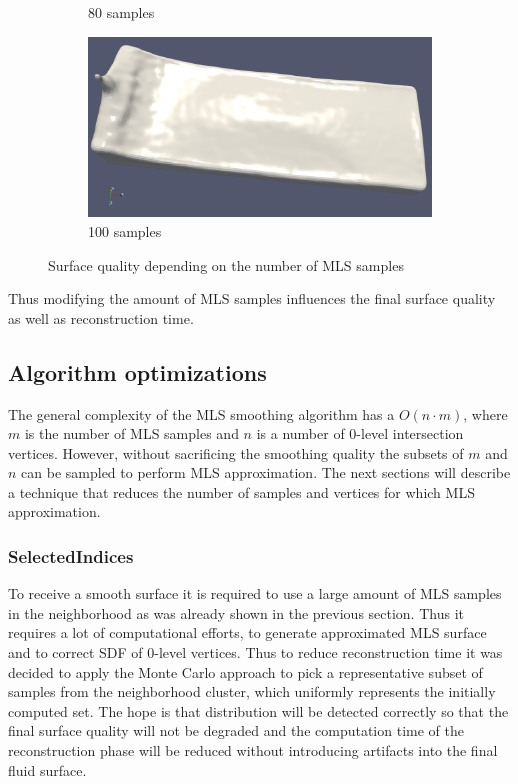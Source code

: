 \begin{figure}[H]
\begin{center}
\begin{subfigure}[b]{0.4\textwidth}
			\caption{80 samples}
		\end{subfigure}
		\begin{subfigure}[b]{0.4\textwidth}
			\includegraphics[width=\textwidth]{figures/MlsSamples100.png}
			\caption{100 samples}
		\end{subfigure}
	\end{center}
	\caption{Surface quality depending on the number of MLS samples} \label{fig:mls_samples_example_surfaces}
\end{figure}
Thus modifying the amount of MLS samples influences the final surface quality as well as reconstruction time. 
\subsection{Algorithm optimizations}
The general complexity of the MLS smoothing algorithm has a $O(n \cdot m)$, where $m$ is the number of MLS samples and $n$ is a number of 0-level intersection vertices. However, without sacrificing the smoothing quality the subsets of $m$ and $n$ can be sampled to perform MLS approximation. The next sections will describe a technique that reduces the number of samples and vertices for which MLS approximation.
\subsubsection{SelectedIndices}

To receive a smooth surface it is required to use a large amount of MLS samples in the neighborhood as was already shown in the previous section. Thus it requires a lot of computational efforts, to generate approximated MLS surface and to correct SDF of 0-level vertices. Thus to reduce reconstruction time it was decided to apply the Monte Carlo approach to pick a representative subset of samples from the neighborhood cluster, which uniformly represents the initially computed set. The hope is that distribution will be detected correctly so that the final surface quality will not be degraded and the computation time of the reconstruction phase will be reduced without introducing artifacts into the final fluid surface.

